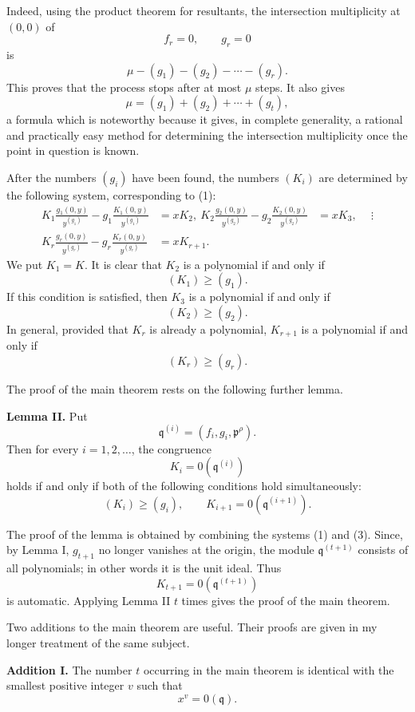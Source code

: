 \documentclass[11pt]{article}
\begin{document}
Indeed, using the product theorem for resultants, the intersection multiplicity at \((0,0)\) of
\[
  f_r=0,
  \qquad
  g_r=0
\]
is
\[
  \mu-(g_1)-(g_2)-\cdots-(g_r).
\]
This proves that the process stops after at most \(\mu\) steps. It also gives
\[
  \mu=(g_1)+(g_2)+\cdots+(g_t),
\tag{2}
\]
a formula which is noteworthy because it gives, in complete generality, a rational and practically easy method for determining the intersection multiplicity once the point in question is known.

After the numbers \((g_i)\) have been found, the numbers \((K_i)\) are determined by the following system, corresponding to (1):
\[
\begin{aligned}
  K_1\frac{g_1(0,y)}{y^{(g_1)}}
     -g_1\frac{K_1(0,y)}{y^{(g_1)}} &= xK_2,\
  K_2\frac{g_2(0,y)}{y^{(g_2)}}
     -g_2\frac{K_2(0,y)}{y^{(g_2)}} &= xK_3,\
  &\ \vdots \\
  K_r\frac{g_r(0,y)}{y^{(g_r)}}
     -g_r\frac{K_r(0,y)}{y^{(g_r)}} &= xK_{r+1}.
\end{aligned}
\tag{3}
\]
We put \(K_1=K\). It is clear that \(K_2\) is a polynomial if and only if
\[
  (K_1)\ge (g_1).
\]
If this condition is satisfied, then \(K_3\) is a polynomial if and only if
\[
  (K_2)\ge (g_2).
\]
In general, provided that \(K_r\) is already a polynomial, \(K_{r+1}\) is a polynomial if and only if
\[
  (K_r)\ge (g_r).
\]

The proof of the main theorem rests on the following further lemma.

\textbf{Lemma II.} Put
\[
  \mathfrak q^{(i)}=(f_i,g_i,\mathfrak p^{\rho}).
\]
Then for every \(i=1,2,\ldots\), the congruence
\[
  K_i=0(\mathfrak q^{(i)})
\]
holds if and only if both of the following conditions hold simultaneously:
\[
  (K_i)\ge (g_i),
  \qquad
  K_{i+1}=0(\mathfrak q^{(i+1)}).
\]

The proof of the lemma is obtained by combining the systems (1) and (3). Since, by Lemma I, \(g_{t+1}\) no longer vanishes at the origin, the module \(\mathfrak q^{(t+1)}\) consists of all polynomials; in other words it is the unit ideal. Thus
\[
  K_{t+1}=0(\mathfrak q^{(t+1)})
\]
is automatic. Applying Lemma II \(t\) times gives the proof of the main theorem.

Two additions to the main theorem are useful. Their proofs are given in my longer treatment of the same subject.

\textbf{Addition I.} The number \(t\) occurring in the main theorem is identical with the smallest positive integer \(v\) such that
\[
  x^v=0(\mathfrak q).
\]
\end{document}
